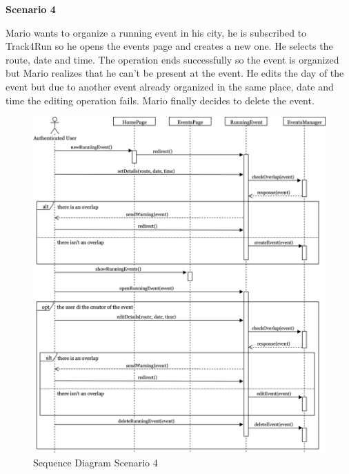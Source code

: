 \documentclass[../main.tex]{subfiles}
\begin{document}
		\begin{minipage}{\textwidth}
			{\bf Scenario 4}
			\vspace{3mm}

			Mario wants to organize a running event in his city, he is subscribed to Track4Run so he opens the events page and creates a new one. He selects the route, date and time. The operation ends successfully so the event is organized but Mario realizes that he can't be present at the event. He edits the day of the event but due to another event already organized in the same place, date and time the editing operation fails. Mario finally decides to delete the event.

			\vspace{5mm}
		\end{minipage}
		\begin{figure}[H]
			\centering
			\includegraphics[scale=.07]{images/sequenceDiagram4.png}
			\caption{Sequence Diagram Scenario 4 \label{fig:Sequence Diagram Scenario 4}}
		\end{figure}
		\begin{minipage}{\textwidth}

		\end{minipage}
\end{document}
